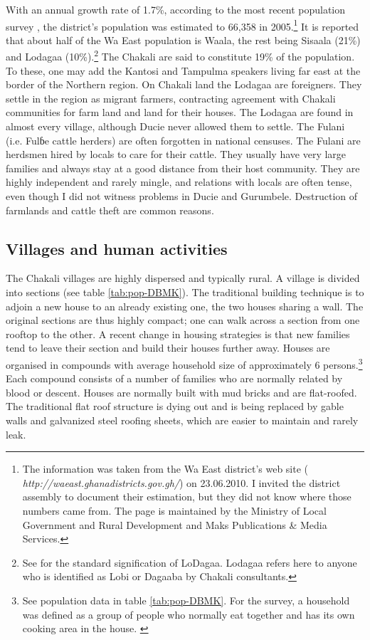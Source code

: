 With an annual growth rate of 1.7\%,  according to the most recent population
survey
\citep{GSS00},  the district's population was estimated  to 66,358 in
2005.\footnote{The information was taken
from the Wa East district's web site ({\it
http://waeast.ghanadistricts.gov.gh/}) on 23.06.2010. I invited the district assembly to
document their estimation, but they did not know where
those numbers came from. The page is maintained by the Ministry of Local
Government and Rural Development and Maks Publications \& Media Services.}  It
is reported that about half of the Wa East population is Waala, the rest being
Sisaala (21\%) and Lodagaa (10\%).\footnote{See 
\cite{Good62} for the standard signification of LoDagaa. Lodagaa refers here to
anyone who is  identified as {\F Lobi} or {\F Dagaaba}
by Chakali consultants.} The Chakali are said to
constitute 19\% of the population. To these, one may add the  Kantosi and
Tampulma
speakers living far east at the border of the Northern region. On Chakali land
the Lodagaa are foreigners. They settle in the region as migrant farmers,
contracting agreement with Chakali communities for farm land  and land  for
their houses. The  Lodagaa are found in almost every village, although
Ducie never allowed them to settle.  The Fulani (i.e. {\I Fulɓe}
cattle herders) are often forgotten in national
censuses. The Fulani are herdsmen hired by locals to care for their cattle. 
They
usually have very large families and always stay at a good distance from their
host community. They are highly independent and rarely mingle, and  relations
with locals are often tense, even though I did not witness
problems in Ducie and Gurumbele.  Destruction of farmlands and 
cattle theft are common reasons.


\subsection{Villages and human activities}
\label{sec:SOC-demo}

The Chakali villages are highly dispersed and typically  rural.  A
village is divided into sections (see table \ref{tab:pop-DBMK}). The
traditional building technique is to adjoin a
new house to an already existing one, the two houses sharing a wall. The
original
 sections are thus highly compact; one can walk across a section from one
rooftop to the other. A recent change in housing strategies is that new families
tend to leave their
section and build their houses further away. Houses 
are organised in compounds with average household size of approximately 6
persons.\footnote{See  population data in table
\ref{tab:pop-DBMK}. For the
survey, a household was defined as a group of people who normally eat together
and  has its own cooking area in the house. \label{ft:hshold}} Each compound
consists of a number
of families  who are normally related by blood or descent. Houses are normally
built
with mud bricks and are flat-roofed. The traditional flat roof structure  is dying
out and is being replaced by  gable walls and  galvanized steel roofing sheets, which are easier
to maintain and
rarely leak.
 


